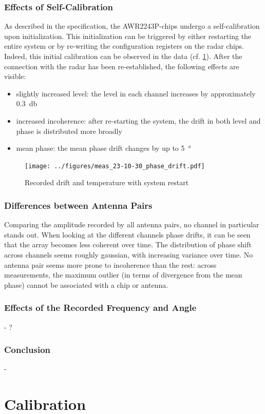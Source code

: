 \subsubsection*{Effects of Self-Calibration}
As described in the specification, the AWR2243P-chips undergo a self-calibration upon initialization.
This initialization can be triggered by either restarting the entire system or by re-writing the configuration registers on the radar chips.
Indeed, this initial calibration can be observed in the data (cf. \ref{fig:restart}). After the connection with the radar has been re-established, the following effects are visible:
\begin{itemize}
    \item slightly increased level: the level in each channel increases by approximately \SI{0.3}{\decibel}
    \item increased incoherence: after re-starting the system, the drift in both level and phase is distributed more broadly
    \item mean phase: the mean phase drift changes by up to \SI{5}{\degree}
\end{itemize}

\begin{figure}
    \centering
    \texttt{[image: ../figures/meas\_23-10-30\_phase\_drift.pdf]}
    \caption{Recorded drift and temperature with system restart}
    \label{fig:restart}
\end{figure}


\subsubsection*{Differences between Antenna Pairs}
Comparing the amplitude recorded by all antenna pairs, no channel in particular stands out.
When looking at the different channels phase drifts, it can be seen that the array becomes less coherent over time.
The distribution of phase shift across channels seems roughly gaussian, with increasing variance over time.
No antenna pair seems more prone to incoherence than the rest:
across measurements, the maximum outlier (in terms of divergence from the mean phase) cannot be associated with a chip or antenna.

\subsubsection*{Effects of the Recorded Frequency and Angle}
- ?
\subsubsection*{Conclusion}
-
\section{Calibration}
\label{sec:calibration}